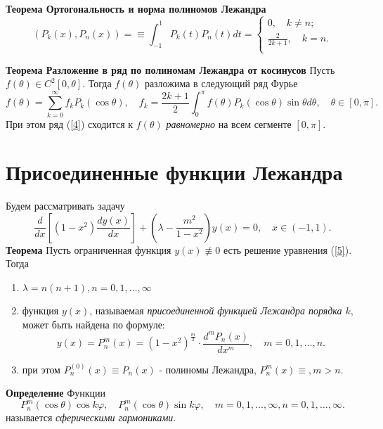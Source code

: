 \documentclass{article}
\begin{document}
\noindent\textbf{Теорема Ортогональность и норма полиномов Лежандра}
\begin{equation}
(P_k(x),P_n(x))=\equiv \int_{-1}^{1}P_k(t)P_n(t)dt=\left\{\begin{array}{l}
0,\quad k\ne n;\\
\frac{2}{2k+1},\quad k=n.\\
\end{array}\right.
\end{equation} 

\noindent\textbf{Теорема Разложение в ряд по полиномам Лежандра от косинусов} Пусть $f(\theta)\in C^2[0,\theta]$. Тогда $f(\theta)$ разложима в следующий ряд Фурье
\begin{equation}
f(\theta)=\sum_{k=0}^{\infty} f_kP_k(\cos\theta),\quad f_k=\frac{2k+1}{2}\int_{0}^{\pi} f(\theta) P_k(\cos\theta) \sin\theta d\theta, \quad \theta\in[0,\pi].
\label{4}
\end{equation}
При этом ряд (\ref{4}) сходится к $f(\theta)$ \emph{равномерно} на всем сегменте $[0,\pi]$. 
\section{Присоединенные функции Лежандра}
Будем рассматривать задачу
\begin{equation}
\frac{d}{dx}\left[\left(1-x^2\right)\frac{dy(x)}{dx}\right]+\left(\lambda-\frac{m^2}{1-x^2}\right)y(x)=0,\quad x\in(-1,1).
\label{5}
\end{equation}
\textbf{Теорема} Пусть ограниченная функция $y(x)\not\equiv 0$ есть решение уравнения (\ref{5}). Тогда
\begin{enumerate}
	\item $\lambda=n(n+1), n=0,1,\ldots,\infty$
	\item функция $y(x)$, называемая \emph{присоединенной функцией Лежандра порядка $k$}, может быть найдена по формуле:
	\begin{equation}
	y(x)=P_n^m(x)=\left(1-x^2\right)^{\frac{m}{2}}\cdot\frac{d^mP_n(x)}{dx^m},\quad m=0,1,\ldots,n.
	\end{equation}
	\item при этом $P_n^{(0)}(x)\equiv P_n(x)$ - полиномы Лежандра, $P_n^m(x)\equiv, m>n$.
\end{enumerate}

\noindent\textbf{Определение} Функции 
\begin{equation}
P_n^m(\cos\theta)\cos k\varphi,\quad P_n^m(\cos\theta)\sin k\varphi,\quad m=0,1,\ldots,\infty,n=0,1,\ldots,\infty.
\end{equation}
называется \emph{сферическими гармониками}.\\
\end{document}
